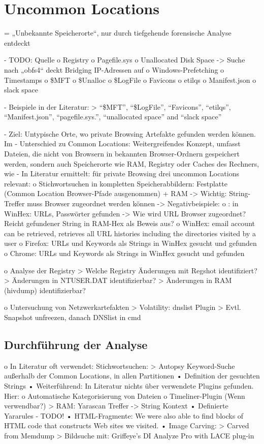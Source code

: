 \section{Uncommon Locations}

= „Unbekannte Speicherorte“, nur durch tiefgehende forensische Analyse entdeckt

- TODO: Quelle
o	Registry
o	Pagefile.sys
o	Unallocated Disk Space
	->	Suche nach „obfs4“ deckt Bridging IP-Adressen auf
o	Windows-Prefetching
o	Timestamps
o	\$MFT
o	\$Unalloc
o	\$LogFile
o	Favicons
o	etilqs
o	Manifest.json
o	slack space

- Beispiele in der Literatur:
	> “\$MFT”, “\$LogFile”, “Favicons”, “etilqs”, “Manifest.json”, “pagefile.sys.”, “unallocated space” and “slack space” \cite{Montasari.2015}


-	Ziel: Untypische Orte, wo private Browsing Artefakte gefunden werden können. Im
-	Unterschied zu Common Locations: Weitergreifendes Konzept, umfasst Dateien, die nicht von Browsern in bekannten Browser-Ordnern gespeichert werden, sondern auch Speicherorte wie RAM, Registry oder Caches des Rechners, wie 
-	In Literatur ermittelt: für private Browsing drei uncommon Locations relevant:
	o	Stichwortsuchen in kompletten Speicherabbildern: Festplatte (Common Location Browser-Pfade ausgenommen) + RAM 
		-> Wichtig: String-Treffer muss Browser zugeordnet werden können
		-> Negativbeispiele:
			o \cite{Rochmadi.2017}: in WinHex: URLs, Passwörter gefunden -> Wie wird URL Browser zugeordnet? Reicht gefundener String in RAM-Hex als Beweis aus?
			o \cite{Md.2018} WinHex: email account can be retrieved, retrieves all URL histories including the directories visited by a user
			o \cite{Montasari.2015}	Firefox: URLs und Keywords als Strings in WinHex gesucht und gefunden 
			o \cite{Montasari.2015}	Chrome: URLs und Keywords als Strings in WinHex gesucht und gefunden
			
	o	Analyse der Registry
		>	Welche Registry Änderungen mit Regshot identifiziert?
		>	Änderungen in NTUSER.DAT identifizierbar?
		>	Änderungen in RAM (hivdump) identifizierbar?
	
	o	Untersuchung von Netzwerkartefakten
		>	Volatility: dnslist Plugin
		>	Evtl. Snapshot unfreezen, danach DNSlist in cmd
		


\subsection*{Durchführung der Analyse}
o	In Literatur oft verwendet: Stichwortsuchen:
>	Autopsy Keyword-Suche außerhalb der Common Locations, in allen Partitionen
	•	Definition der gesuchten Strings
	•	Weiterführend:  In Literatur nichts über verwendete Plugins gefunden. Hier:
		o	Automatische Kategorisierung von Dateien
		o	Timeliner-Plugin (Wenn verwendbar?)
>	RAM: Yarascan Treffer -> String Kontext
	•	Definierte Yararules
		- TODO!
	•	HTML-Fragmente: \cite{Said.2011} We were also able to find blocks of HTML code that constructs Web sites we visited.
	•	Image Carving: 
		> Carved from Memdump \cite{Ohana.2013}
		>  Bildsuche mit: Griffeye’s DI Analyze Pro with LACE plug-in \cite{Horsman.2019}
	
